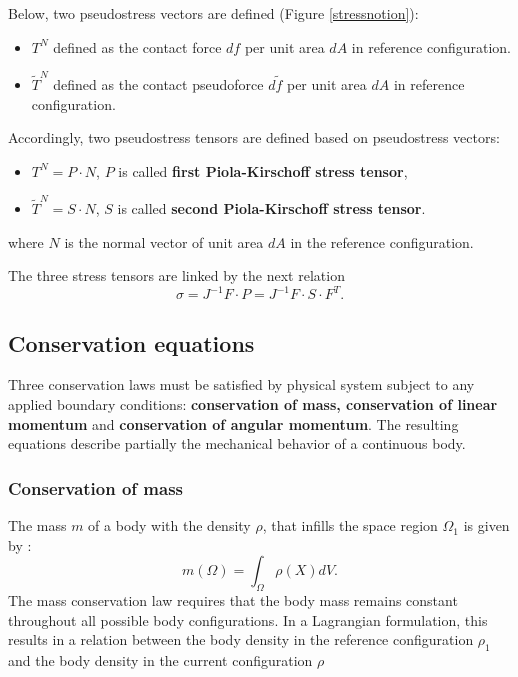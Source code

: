 Below, two pseudostress vectors are defined (Figure  \ref{stressnotion}):
\begin{itemize}
\item $T^N$ defined as the contact force $df$ per unit area $dA$ in reference configuration.
\item $\tilde{T}^N$ defined as the contact pseudoforce $d\tilde{f}$ per unit area $dA$ in reference configuration.  
\end{itemize}


Accordingly, two pseudostress tensors are defined based on pseudostress vectors:
\begin{itemize}
\item $T^N = P \cdot N$, $P$ is called \textbf{first Piola-Kirschoff stress tensor},
\item  $\tilde{T}^N = S \cdot N $, $S$ is called \textbf{second Piola-Kirschoff stress tensor}. 
\end{itemize} 
where $N$ is the normal vector of unit area $dA$ in the reference configuration.

The three stress tensors are linked by the next relation 
\begin{equation}
\sigma = J^{-1}F \cdot P = J^{-1} F \cdot S \cdot F^T.
\label{PK12}
\end{equation}


\subsection{Conservation equations}\label{subsection:conservationequations}
Three conservation laws must be satisfied by physical system subject to any applied boundary conditions: \textbf{conservation of mass, conservation of linear momentum} and \textbf{conservation of angular momentum}. The resulting equations describe partially the mechanical behavior of a continuous body.

\subsubsection*{ Conservation of mass}
The mass $m$ of a body with the density $\rho$, that infills the space region $\Omega_1$ is given by :
\begin{equation}
m(\Omega) = \int_{\Omega} \rho(X)dV.
\end{equation}
The mass conservation law requires that the body mass remains constant throughout all possible body configurations. In a Lagrangian formulation, this results in a relation between the body density in the reference configuration $\rho_1$ and the body density in the current configuration $\rho$

